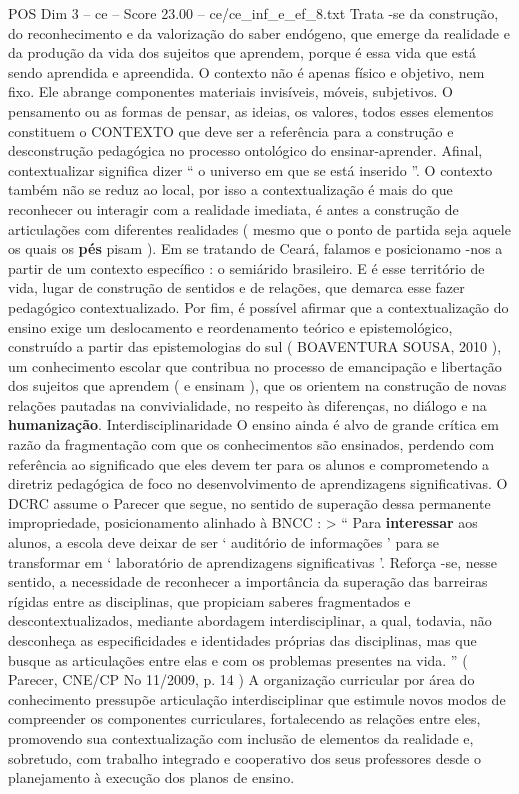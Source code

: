 \begin{textsample}{POS Dim 3 – ce – Score 23.00 – ce/ce\_inf\_e\_ef\_8.txt}
Trata -se da construção, do reconhecimento e da valorização do saber endógeno, que emerge da realidade e da produção da vida dos sujeitos que aprendem, porque é essa vida que está sendo aprendida e apreendida.
O contexto não é apenas físico e objetivo, nem fixo.
Ele abrange componentes materiais invisíveis, móveis, subjetivos.
O pensamento ou as formas de pensar, as ideias, os valores, todos esses elementos constituem o CONTEXTO que deve ser a referência para a construção e desconstrução pedagógica no processo ontológico do ensinar-aprender.
Afinal, contextualizar significa dizer “ o universo em que se está inserido ”.
O contexto também não se reduz ao local, por isso a contextualização é mais do que reconhecer ou interagir com a realidade imediata, é antes a construção de articulações com diferentes realidades ( mesmo que o ponto de partida seja aquele os quais os \textbf{pés} pisam ).
Em se tratando de Ceará, falamos e posicionamo -nos a partir de um contexto específico : o semiárido brasileiro.
E é esse território de vida, lugar de construção de sentidos e de relações, que demarca esse fazer pedagógico contextualizado.
Por fim, é possível afirmar que a contextualização do ensino exige um deslocamento e reordenamento teórico e epistemológico, construído a partir das epistemologias do sul ( BOAVENTURA SOUSA, 2010 ), um conhecimento escolar que contribua no processo de emancipação e libertação dos sujeitos que aprendem ( e ensinam ), que os orientem na construção de novas relações pautadas na convivialidade, no respeito às diferenças, no diálogo e na \textbf{humanização}.
Interdisciplinaridade O ensino ainda é alvo de grande crítica em razão da fragmentação com que os conhecimentos são ensinados, perdendo com referência ao significado que eles devem ter para os alunos e comprometendo a diretriz pedagógica de foco no desenvolvimento de aprendizagens significativas.
O DCRC assume o Parecer que segue, no sentido de superação dessa permanente impropriedade, posicionamento alinhado à BNCC : > “ Para \textbf{interessar} aos alunos, a escola deve deixar de ser ‘ auditório de informações ’ para se transformar em ‘ laboratório de aprendizagens significativas ’.
Reforça -se, nesse sentido, a necessidade de reconhecer a importância da superação das barreiras rígidas entre as disciplinas, que propiciam saberes fragmentados e descontextualizados, mediante abordagem interdisciplinar, a qual, todavia, não desconheça as especificidades e identidades próprias das disciplinas, mas que busque as articulações entre elas e com os problemas presentes na vida. ” ( Parecer, CNE/CP No 11/2009, p. 14 ) A organização curricular por área do conhecimento pressupõe articulação interdisciplinar que estimule novos modos de compreender os componentes curriculares, fortalecendo as relações entre eles, promovendo sua contextualização com inclusão de elementos da realidade e, sobretudo, com trabalho integrado e cooperativo dos seus professores desde o planejamento à execução dos planos de ensino.

\end{textsample}
